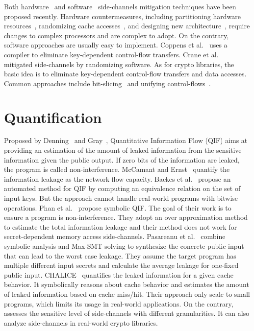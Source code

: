Both hardware~\cite{Page2005PartitionedCA,
    Wang:2007:NCD:1250662.1250723,Zhang:2015:HDL:2775054.2694372,Li:2014:SLH:2541940.2541947,
    236344, 236334} and software~\cite{shih2017t,Coppens:2009:PMT:1607723.1608124,
    brickell2006software,crane2015thwarting, 197207} side-channels mitigation techniques have
been proposed recently. Hardware countermeasures, including partitioning hardware resources~\cite{Page2005PartitionedCA}, randomizing cache
accesses~\cite{Wang:2007:NCD:1250662.1250723, 236344}, and designing new
architecture~\cite{tiwari2011crafting}, require changes to complex processors and are complex to adopt. On the contrary, software approaches are
usually easy to implement. Coppens et
al.~\cite{Coppens:2009:PMT:1607723.1608124} uses a compiler
to eliminate key-dependent control-flow transfers. Crane et
al.~\cite{crane2015thwarting} mitigated side-channels by randomizing software.
As for crypto libraries, the basic idea is to eliminate key-dependent
control-flow transfers and data accesses. Common approaches include
bit-slicing~\cite{konighofer2008fast,rebeiro2006bitslice} and unifying
control-flows~\cite{Coppens:2009:PMT:1607723.1608124}.

\section{Quantification}
Proposed by Denning~\cite{robling1982cryptography} and Gray~\cite{gray1992toward},
Quantitative Information Flow (QIF) aims at providing an estimation of the amount of leaked information from the sensitive information given the public output. If zero bits
of the information are leaked, the program is called non-interference. McCamant
and Ernst~\cite{McCamantE2008} quantify the information leakage as the network
flow capacity. Backes et al.~\cite{5207642} propose an automated method for QIF
by computing an equivalence relation on the set of input keys. But the approach
cannot handle real-world programs with bitwise operations.
Phan et al.~\cite{Phan:2012:SQI:2382756.2382791} propose symbolic QIF. The goal of their
work is to ensure a program is non-interference. They adopt an over
approximation method to estimate the total information leakage and their method
does not work for secret-dependent memory access side-channels.
Pasareanu et al.~\cite{pasareanu2016multi} combine symbolic analysis and Max-SMT solving to synthesize the concrete public input that can lead to the worst case leakage. They assume the target program has multiple different input secrets and calculate the average leakage for one-fixed public input.
CHALICE~\cite{Chattopadhyay:2017:QIL:3127041.3127044} quantifies the leaked
information for a given cache behavior.
It symbolically reasons about cache
behavior and estimates the amount of leaked information based on cache miss/hit.
Their approach only scale to small programs, which limits its usage in
real-world applications. On the contrary, \tool{} assesses the sensitive level
of side-channels with different granularities. It can also analyze side-channels
in real-world crypto libraries.

